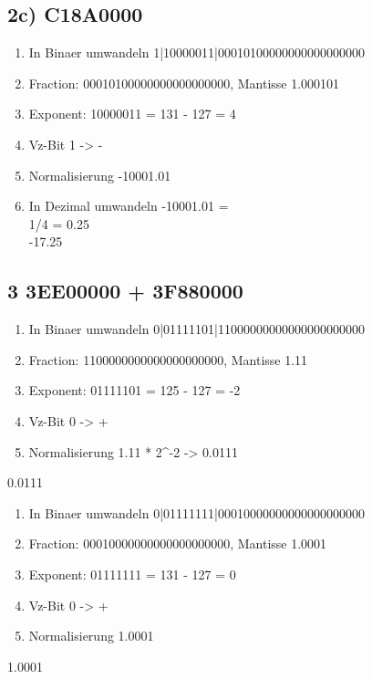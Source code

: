 \documentclass[]{article}
\providecommand{\tightlist}{%
  \setlength{\itemsep}{0pt}\setlength{\parskip}{0pt}}
\begin{document}
\subsection{2c) C18A0000}\label{c-c18a0000}

\begin{enumerate}
\tightlist
\item
  In Binaer umwandeln
  1|10000011|00010100000000000000000
\item
  Fraction: 00010100000000000000000, Mantisse 1.000101
\item
  Exponent: 10000011 = 131 - 127 = 4
\item
  Vz-Bit 1 -> -
\item
  Normalisierung -10001.01
\item
  In Dezimal umwandeln -10001.01 =\\
  1/4 = 0.25\\
  -17.25
\end{enumerate}

\pagebreak

\subsection{3 3EE00000 + 3F880000}\label{ee00000-3f880000}

\begin{enumerate}
\tightlist
\item
  In Binaer umwandeln
  0|01111101|11000000000000000000000
\item
  Fraction: 1100000000000000000000, Mantisse 1.11
\item
  Exponent: 01111101 = 125 - 127 = -2
\item
  Vz-Bit 0 -> +
\item
  Normalisierung 1.11 * 2\^{}-2 -> 0.0111
\end{enumerate}

0.0111

\begin{enumerate}
\tightlist
\item
  In Binaer umwandeln
  0|01111111|00010000000000000000000
\item
  Fraction: 00010000000000000000000, Mantisse 1.0001
\item
  Exponent: 01111111 = 131 - 127 = 0
\item
  Vz-Bit 0 -> +
\item
  Normalisierung 1.0001
\end{enumerate}

1.0001
\end{document}
